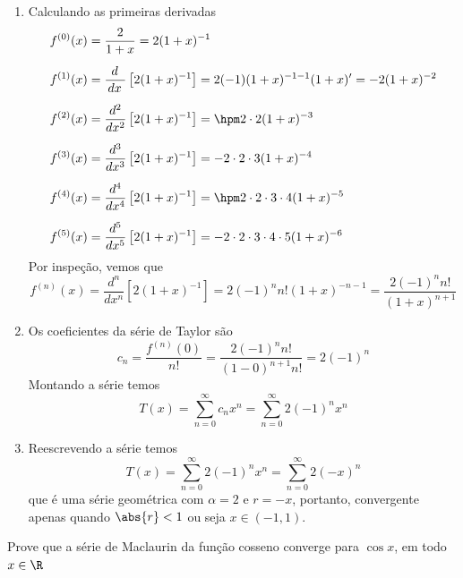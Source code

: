 \documentclass[a4paper,12pt,fleqn]{article}
\begin{document}
\begin{answer}
  \begin{enumerate}[label=\alph*)]
    \item Calculando as primeiras derivadas
    \begin{align*}
      f^{(0)}(x) & = \frac{2}{1+x} = 2(1+x)^{-1} \\[2mm]
      f^{(1)}(x) & = \frac{\,d\;}{\,dx\;}\left[2(1+x)^{-1}\right]
      = 2(-1)(1+x)^{-1-1} (1+x)'
      = -2 (1+x)^{-2} \\[2mm]
      f^{(2)}(x) & = \frac{d^2}{dx^2}\left[2(1+x)^{-1}\right]
      = \hpm 2 \cdot 2                 (1+x)^{-3} \\[2mm]
      f^{(3)}(x) & = \frac{d^3}{dx^3}\left[2(1+x)^{-1}\right]
      = -2 \cdot 2 \cdot 3         (1+x)^{-4} \\[2mm]
      f^{(4)}(x) & = \frac{d^4}{dx^4}\left[2(1+x)^{-1}\right]
      = \hpm 2 \cdot 2 \cdot 3 \cdot 4 (1+x)^{-5} \\[2mm]
      f^{(5)}(x) & = \frac{d^5}{dx^5}\left[2(1+x)^{-1}\right]
      = - 2 \cdot 2 \cdot 3 \cdot 4 \cdot 5 (1+x)^{-6}
    \end{align*}
    Por inspeção, vemos que
    \[
      f^{(n)}(x)
      = \frac{d^n}{dx^n}\left[2(1+x)^{-1}\right]
      = 2(-1)^n n! (1+x)^{-n-1}
      = \frac{2 (-1)^n n!}{(1+x)^{n+1}}
    \]
    \item Os coeficientes da série de Taylor são
    \[
      c_n
      = \frac{f^{(n)}(0)}{n!}
      = \frac{2(-1)^n n!}{(1-0)^{n+1}n!}
      = 2(-1)^n
    \]
    Montando a série temos
    \[
      T(x)
      = \sum_{n=0}^\infty c_n x^n
      = \sum_{n=0}^\infty 2(-1)^n x^n
    \]
    \item Reescrevendo a série temos
    \[
      T(x)
      = \sum_{n=0}^\infty 2 (-1)^n x^n
      = \sum_{n=0}^\infty 2 (-x)^n
    \]
    que é uma série geométrica com \(\alpha = 2\) e \(r = -x\),
    portanto, convergente apenas quando \(\abs{r}<1\) ou seja \(x\in(-1, 1)\).
  \end{enumerate}
\end{answer}

Prove que a série de Maclaurin da função cosseno
converge para $\cos x$, em todo $x\in\R$
\end{document}
